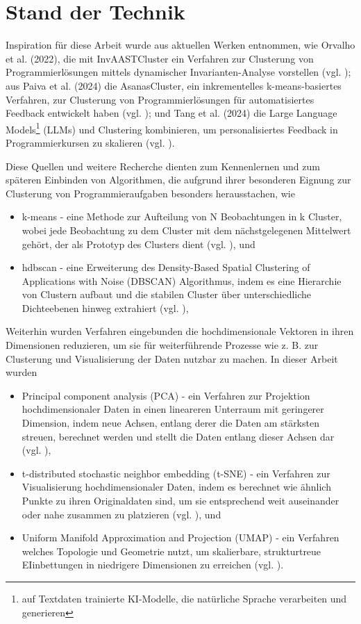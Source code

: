\section{Stand der Technik}
Inspiration für diese Arbeit wurde aus aktuellen Werken entnommen, wie Orvalho et al. (2022), die mit InvAASTCluster ein Verfahren zur Clusterung von Programmierlösungen mittels dynamischer Invarianten-Analyse vorstellen (vgl. \cite{Orvalho.28.06.2022}); aus Paiva et al. (2024) die AsanasCluster, ein inkrementelles k-means-basiertes Verfahren, zur Clusterung von Programmierlösungen für automatisiertes Feedback entwickelt haben (vgl. \cite{Paiva.2024}); und Tang et al. (2024) die Large Language Models\footnote{auf Textdaten trainierte KI-Modelle, die natürliche Sprache verarbeiten und generieren} (LLMs) und Clustering kombinieren, um personalisiertes Feedback in Programmierkursen zu skalieren (vgl. \cite{Tang.21.10.2024}).

Diese Quellen und weitere Recherche dienten zum Kennenlernen und zum späteren Einbinden von Algorithmen, die aufgrund ihrer besonderen Eignung zur Clusterung von Programmieraufgaben besonders herausstachen, wie 
\begin{itemize}
    \item k-means - eine Methode zur Aufteilung von N Beobachtungen in k Cluster, wobei jede Beobachtung zu dem Cluster mit dem nächstgelegenen Mittelwert gehört, der als Prototyp des Clusters dient (vgl. \cite{MacQueen.1967}), und
    \item hdbscan - eine Erweiterung des Density-Based Spatial Clustering of Applications with Noise (DBSCAN) Algorithmus, indem es eine Hierarchie von Clustern aufbaut und die stabilen Cluster über unterschiedliche Dichteebenen hinweg extrahiert (vgl. \cite{CampelloRicardoJ.G.B..2013}),
\end{itemize}
Weiterhin wurden Verfahren eingebunden die hochdimensionale Vektoren in ihren Dimensionen reduzieren, um sie für weiterführende Prozesse wie z. B. zur Clusterung und Visualisierung der Daten nutzbar zu machen. In dieser Arbeit wurden
\begin{itemize}
    \item Principal component analysis (PCA) - ein Verfahren zur Projektion hochdimensionaler Daten in einen lineareren Unterraum mit geringerer Dimension, indem neue Achsen, entlang derer die Daten am stärksten streuen, berechnet werden und stellt die Daten entlang dieser Achsen dar (vgl. \cite{KarlPearson.1901}),
    \item t-distributed stochastic neighbor embedding (t-SNE) - ein Verfahren zur Visualisierung hochdimensionaler Daten, indem es berechnet wie ähnlich Punkte zu ihren Originaldaten sind, um sie entsprechend weit auseinander oder nahe zusammen zu platzieren (vgl. \cite{LaurensvanderMaatenundGeoffreyHinton.2008}), und
    \item Uniform Manifold Approximation and Projection (UMAP) - ein Verfahren welches Topologie und Geometrie nutzt, um skalierbare, strukturtreue EIinbettungen in niedrigere Dimensionen zu erreichen (vgl. \cite{McInnes.09.02.2018}).
\end{itemize}

